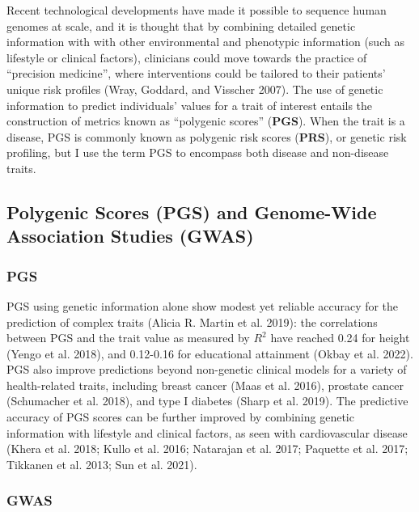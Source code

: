 \documentclass[
]{book}
\begin{document}
Recent technological developments have made it possible to sequence human genomes at scale, and it is thought that by combining detailed genetic information with with other environmental and phenotypic information (such as lifestyle or clinical factors), clinicians could move towards the practice of ``precision medicine'', where interventions could be tailored to their patients' unique risk profiles (Wray, Goddard, and Visscher 2007). The use of genetic information to predict individuals' values for a trait of interest entails the construction of metrics known as ``polygenic scores'' (\textbf{PGS}). When the trait is a disease, PGS is commonly known as polygenic risk scores (\textbf{PRS}), or genetic risk profiling, but I use the term PGS to encompass both disease and non-disease traits.

\hypertarget{polygenic-scores-pgs-and-genome-wide-association-studies-gwas}{%
\subsection{Polygenic Scores (PGS) and Genome-Wide Association Studies (GWAS)}\label{polygenic-scores-pgs-and-genome-wide-association-studies-gwas}}

\hypertarget{pgs-1}{%
\subsubsection{PGS}\label{pgs-1}}

PGS using genetic information alone show modest yet reliable accuracy for the prediction of complex traits (Alicia R. Martin et al. 2019): the correlations between PGS and the trait value as measured by \(R^2\) have reached 0.24 for height (Yengo et al. 2018), and 0.12-0.16 for educational attainment (Okbay et al. 2022). PGS also improve predictions beyond non-genetic clinical models for a variety of health-related traits, including breast cancer (Maas et al. 2016), prostate cancer (Schumacher et al. 2018), and type I diabetes (Sharp et al. 2019). The predictive accuracy of PGS scores can be further improved by combining genetic information with lifestyle and clinical factors, as seen with cardiovascular disease (Khera et al. 2018; Kullo et al. 2016; Natarajan et al. 2017; Paquette et al. 2017; Tikkanen et al. 2013; Sun et al. 2021).

\hypertarget{gwas-1}{%
\subsubsection{GWAS}\label{gwas-1}}
\end{document}
